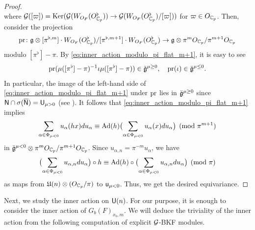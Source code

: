 \documentclass[12pt,reqno]{amsart}
\begin{document}
\begin{proof}
\[    \]
    where ${\mathcal{G}}([\varpi]) = {\operatorname{Ker}}({\mathcal{G}}(W_{O_F}(O_{\mathbb{C}_p}^\flat)) \to {\mathcal{G}}(W_{O_F}(O_{\mathbb{C}_p}^\flat) / [\varpi]))$ for $\varpi \in O_{\mathbb{C}_p}$. Then, consider the projection 
    \[
        {\operatorname{pr}} \colon {\mathfrak{g}} \otimes [\pi^{\flat, m}] \cdot W_{O_F}(O_{\mathbb{C}_p}^\flat) / [\pi^{\flat, m + 1}] \cdot W_{O_F}(O_{\mathbb{C}_p}^\flat) \to {\mathfrak{g}} \otimes \pi^{m} O_{\mathbb{C}_p} / \pi^{m + 1} O_{\mathbb{C}_p}
    \]
    modulo $[\pi^\flat] - \pi$. By \eqref{eq:inner_action_modulo_pi_flat_m+1}, it is easy to see 
    \[
        {\operatorname{pr}}(\mu([\pi^\flat] - \pi)^{-1} \iota \mu([\pi^\flat] - \pi)) \in \breve{{\mathfrak{g}}}^{\mu \geq 0}, \quad 
        {\operatorname{pr}}(\iota) \in \breve{{\mathfrak{g}}}^{\mu \leq 0}. 
    \]
    In particular, the image of the left-hand side of \eqref{eq:inner_action_modulo_pi_flat_m+1} under ${\operatorname{pr}}$ lies in ${\mathfrak{\breve{g}}}^{\mu \geq 0}$ since ${\mathsf{N}} \cap \sigma({\overline{{\mathsf{N}}}}) = {\mathsf{U}}_{\mu > 0}$ (see ). It follows that \eqref{eq:inner_action_modulo_pi_flat_m+1} implies 
    \[
        \sum_{\alpha \in \Phi_{\mu < 0}} u_\alpha(hx) du_\alpha \equiv {\operatorname{Ad}}(h)\bigl(\sum_{\alpha \in \Phi_{\mu < 0}} u_\alpha(x) du_\alpha\bigr) \pmod{\pi^{m + 1}}
    \]
    in $\breve{{\mathfrak{g}}}^{\mu < 0} \otimes \pi^{m} O_{\mathbb{C}_p} / \pi^{m + 1} O_{\mathbb{C}_p}$. Since $u_{\alpha, n} = \pi^{-m}u_\alpha$, we have 
    \[
        \bigl(\sum_{\alpha \in \Phi_{\mu < 0}} u_{\alpha, n} du_\alpha\bigr) \circ h \equiv {\operatorname{Ad}}(h) \circ \bigl(\sum_{\alpha \in \Phi_{\mu < 0}} u_{\alpha, n} du_\alpha \bigr) \pmod{\pi}
    \]
    as maps from ${\mathfrak{U}}(n) \otimes (O_{\mathbb{C}_p} / \pi)$ to ${\mathsf{u}}_{\mu < 0}$. Thus, we get the desired equivariance. 
\end{proof}

Next, we study the inner action on ${\mathsf{U}}(n)$. For our purpose, it is enough to consider the inner action of $G_b(F)_{x_b, m}$. We will deduce the triviality of the inner action from the following computation of explicit ${\mathcal{G}}$-BKF modules. 
\end{document}
